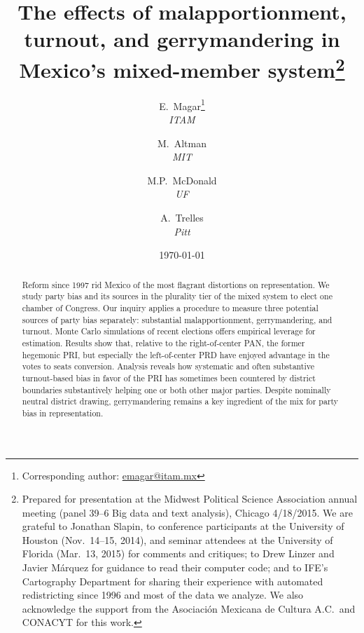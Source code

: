 \documentclass[letter,12pt]{article}
\begin{document}
\title{The effects of malapportionment, turnout, and gerrymandering in Mexico's mixed-member system\thanks{Prepared for presentation at the Midwest Political Science Association annual meeting (panel 39--6 Big data and text analysis), Chicago 4/18/2015. We are grateful to Jonathan Slapin, to conference participants at the University of Houston (Nov.~14--15, 2014), and seminar attendees at the University of Florida (Mar.~13, 2015) for comments and critiques; to Drew Linzer and Javier M\'arquez for guidance to read their computer code; and to IFE's Cartography Department for sharing their experience with automated redistricting since 1996 and most of the data we analyze. We also acknowledge the support from the Asociaci\'on Mexicana de Cultura A.C.\ and CONACYT for this work.}}
\author{E.~Magar\footnote{Corresponding author: \url{emagar@itam.mx}} \\ \emph{ITAM} \and
        M.~Altman \\ \emph{MIT} \and
        M.P.~McDonald \\ \emph{UF} \and  
        A.~Trelles \\ \emph{Pitt}
      }
\date{\today}
\maketitle



\begin{abstract}
\noindent Reform since 1997 rid Mexico of the most flagrant distortions on representation. We study party bias and its sources in the plurality tier of the mixed system to elect one chamber of Congress. Our inquiry applies a procedure to measure three potential sources of party bias separately: substantial malapportionment, gerrymandering, and turnout. Monte Carlo simulations of recent elections offers empirical leverage for estimation. Results show that, relative to the right-of-center PAN, the former hegemonic PRI, but especially the left-of-center PRD have enjoyed advantage in the votes to seats conversion. Analysis reveals how systematic and often substantive turnout-based bias in favor of the PRI has sometimes been countered by district boundaries substantively helping one or both other major parties. Despite nominally neutral district drawing, gerrymandering remains a key ingredient of the mix for party bias in representation.
\end{abstract}
\end{document}
